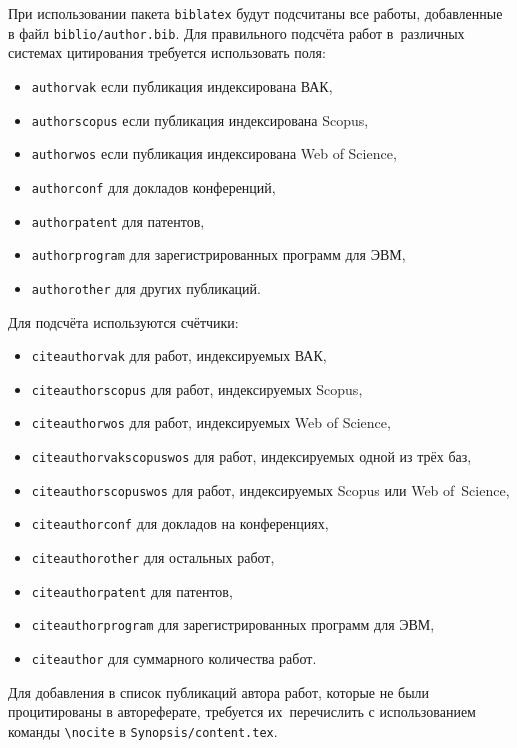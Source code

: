 При использовании пакета \verb!biblatex! будут подсчитаны все работы, добавленные
в файл \verb!biblio/author.bib!. Для правильного подсчёта работ в~различных
системах цитирования требуется использовать поля:
\begin{itemize}
        \item \texttt{authorvak} если публикация индексирована ВАК,
        \item \texttt{authorscopus} если публикация индексирована Scopus,
        \item \texttt{authorwos} если публикация индексирована Web of Science,
        \item \texttt{authorconf} для докладов конференций,
        \item \texttt{authorpatent} для патентов,
        \item \texttt{authorprogram} для зарегистрированных программ для ЭВМ,
        \item \texttt{authorother} для других публикаций.
\end{itemize}
Для подсчёта используются счётчики:
\begin{itemize}
        \item \texttt{citeauthorvak} для работ, индексируемых ВАК,
        \item \texttt{citeauthorscopus} для работ, индексируемых Scopus,
        \item \texttt{citeauthorwos} для работ, индексируемых Web of Science,
        \item \texttt{citeauthorvakscopuswos} для работ, индексируемых одной из трёх баз,
        \item \texttt{citeauthorscopuswos} для работ, индексируемых Scopus или Web of~Science,
        \item \texttt{citeauthorconf} для докладов на конференциях,
        \item \texttt{citeauthorother} для остальных работ,
        \item \texttt{citeauthorpatent} для патентов,
        \item \texttt{citeauthorprogram} для зарегистрированных программ для ЭВМ,
        \item \texttt{citeauthor} для суммарного количества работ.
\end{itemize}

Для добавления в список публикаций автора работ, которые не были процитированы в
автореферате, требуется их~перечислить с использованием команды \verb!\nocite! в
\verb!Synopsis/content.tex!.
\fi
